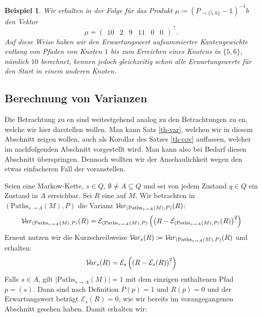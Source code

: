 \documentclass[a4paper]{article}
\newcommand{\mc}{Markow-Kette}
\newtheorem{beispiel}[satz]{Beispiel}
\theoremstyle{nonumberplain}
\begin{document}
\begin{beispiel}
		Wir erhalten in der Folge für das Produkt $\mu \coloneqq (P_{\rightarrow \{5,6\}} - \mathbb{1})^{-1}b$ den Vektor
		\begin{equation*}
		\mu = \begin{pmatrix} 10 & 2 & 9 & 11 & 0 & 0 \end{pmatrix}^\intercal\text{.}
		\end{equation*}
		Auf diese Weise haben wir den Erwartungswert aufsummierter Kantengewichte entlang von Pfaden von Knoten $1$ bis zum Erreichen eines Knotens in $\{5,6\}$, nämlich $10$ berechnet, kennen jedoch gleichzeitig schon alle Erwartungswerte für den Start in einem anderen Knoten.
	\end{beispiel}
	
	\subsection{Berechnung von Varianzen}
	
	Die Betrachtung zu \cov{}en sind weitestgehend analog zu den Betrachtungen zu \var{}en, welche wir hier darstellen wollen. Man kann Satz \ref{th-var}, welchen wir in diesem Abschnitt zeigen wollen, auch als Korollar des Satzes \ref{th-cov} auffassen, welcher im nachfolgenden Abschnitt vorgestellt wird. Man kann also bei Bedarf diesen Abschnitt überspringen. Dennoch wollten wir der Anschaulichkeit wegen den etwas einfacheren Fall der \var{} voranstellen.
	
	Seien \mcex{} eine \mc{}, $s \in Q$, $\emptyset \neq A \subseteq Q$ und  sei von jedem Zustand $q\in Q$ ein Zustand in $A$ erreichbar. Sei $R$ eine  \reward{} auf $M$. Wir betrachten in $(\mathrm{Paths}_{s \rightarrow A}(M), P)$ die Varianz $\mathcal{V}\!ar_{(\mathrm{Paths}_{s \rightarrow A}(M), P)}(R)$:
	\begin{equation}
	\mathcal{V}\!ar_{(\mathrm{Paths}_{s \rightarrow A}(M), P)}(R) = \mathcal{E}_{(\mathrm{Paths}_{s \rightarrow A}(M), P)}\left(\left(R - \mathcal{E}_{(\mathrm{Paths}_{s \rightarrow A}(M), P)} (R)\right)^{2}\right) 
	\end{equation}
	Erneut nutzen wir die Kurzschreibweise $\mathcal{V}\!ar_{s}(R) \coloneqq \mathcal{V}\!ar_{(\mathrm{Paths}_{s \rightarrow A}(M), P)}(R)$ und erhalten:
	\begin{equation}
	\mathcal{V}\!ar_{s}(R) = \mathcal{E}_{s}\left(\left(R - \mathcal{E}_{s} (R)\right)^{2}\right)
	\end{equation}
	Falls $s \in A$, gilt $|\mathrm{Paths}_{s \rightarrow A}(M)| = 1$ mit dem einzigen enthaltenen Pfad $p = (s)$. Dann sind nach Definition $P(p) = 1$ und $R(p) = 0$ und der Erwartungswert beträgt $\mathcal{E}_{s}(R) = 0$, wie wir bereits im vorangegangenen Abschnitt gesehen haben. Damit erhalten wir:
	
\end{document}
